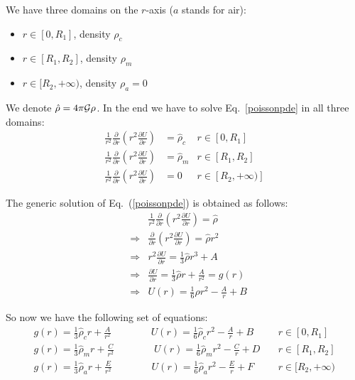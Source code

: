 We have three domains on the $r$-axis ($a$ stands for air): 
\begin{itemize}
\item $r\in [0,R_1]$, density $\rho_c$
\item $r\in [R_1,R_2]$, density $\rho_m$
\item $r\in [R_2,+\infty)$, density $\rho_a=0$
\end{itemize}

We denote $\hat{\rho}=4 \pi {\cal G} \rho$. In the end we have to solve 
Eq.~\ref{poissonpde} in all three domains:
\begin{eqnarray}
\frac{1}{r^2} \frac{\partial}{\partial r}\left( r^2 \frac{\partial U}{\partial r} \right)
&= \hat{\rho}_c & r\in[0,R_1]\\
\frac{1}{r^2} \frac{\partial}{\partial r}\left( r^2 \frac{\partial U}{\partial r} \right)
&= \hat{\rho}_m & r\in[R_1,R_2]\\
\frac{1}{r^2} \frac{\partial}{\partial r}\left( r^2 \frac{\partial U}{\partial r} \right)
&= 0 & r\in[R_2,+\infty)]
\end{eqnarray}

The generic solution of Eq.~(\ref{poissonpde}) is obtained as follows:
\begin{eqnarray}
&& \frac{1}{r^2} \frac{\partial}{\partial r}\left( r^2 \frac{\partial U}{\partial r} \right)
= \hat{\rho}  \\
&\Rightarrow & \frac{\partial}{\partial r}\left( r^2 \frac{\partial U}{\partial r} \right) = \hat{\rho} r^2  \\
&\Rightarrow &  r^2 \frac{\partial U}{\partial r} = \frac{1}{3}\hat{\rho}r^3 + A \\
&\Rightarrow &  \frac{\partial U}{\partial r}= \frac{1}{3}\hat{\rho}r +\frac{A}{r^2} =g(r)\\
&\Rightarrow &  U(r)= \frac{1}{6}\hat{\rho}r^2  -\frac{A}{r} + B 
\end{eqnarray}

So now we have the following set of equations:
\begin{eqnarray}
g(r)= \frac{1}{3}\hat{\rho}_c r +\frac{A}{r^2} \qquad\qquad
U(r)= \frac{1}{6}\hat{\rho}_c r^2  -\frac{A}{r} + B & \quad r\in[0,R_1]\\ 
g(r)= \frac{1}{3}\hat{\rho}_m r +\frac{C}{r^2} \qquad\qquad
U(r)= \frac{1}{6}\hat{\rho}_m r^2  -\frac{C}{r} + D & \quad  r\in[R_1,R_2]\\ 
g(r)= \frac{1}{3}\hat{\rho}_a r +\frac{E}{r^2} \qquad\qquad
U(r)= \frac{1}{6}\hat{\rho}_a r^2  -\frac{E}{r} + F & \quad r\in[R_2,+\infty) 
\end{eqnarray}

